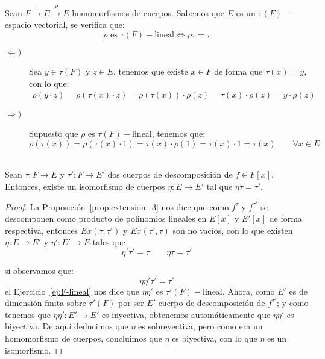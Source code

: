 \begin{ejercicio}\label{ej:F-lineal}
    Sean $F\stackrel{\tau}{\to}E\stackrel{\rho}{\to}E$ homomorfismos de cuerpos. Sabemos que $E$ es un $\tau(F)-$espacio vectorial, se verifica que: 
    \begin{equation*}
        \rho \text{\ es\ } \tau(F)-\text{lineal} \Longleftrightarrow \rho\tau = \tau
    \end{equation*}

    \begin{description}
        \item [$\Longleftarrow )$] Sea $y\in \tau(F)$ y $z\in E$, tenemos que existe $x\in F$ de forma que $\tau(x)=y$, con lo que:
            \begin{align*}
                \rho(y\cdot z) = \rho(\tau(x)\cdot z) = \rho(\tau(x))\cdot \rho(z) = \tau(x)\cdot \rho(z) = y\cdot \rho(z)
            \end{align*}
        \item [$\Longrightarrow )$] Supuesto que $\rho$ es $\tau(F)-$lineal, tenemos que:
            \begin{equation*} 
                \rho(\tau(x)) = \rho(\tau(x)\cdot 1)= \tau(x)\cdot \rho(1) = \tau(x)\cdot 1 = \tau(x) \qquad \forall x\in E
            \end{equation*}
    \end{description}
\end{ejercicio}

\begin{teo} \ \\
    Sean $\tau:F\to E$ y $\tau':F\to E'$ dos cuerpos de descomposición de $f\in F[x]$. Entonces, existe un isomorfismo de cuerpos $\eta:E\to E'$ tal que $\eta \tau = \tau'$.
    \begin{proof}
        La Proposición~\ref{prop:extension_3} nos dice que como $f^\tau$ y $f^{\tau'}$ se descomponen como producto de polinomios lineales en $E[x]$ y $E'[x]$ de forma respectiva, entonces $Ex(\tau,\tau')$ y $Ex(\tau',\tau)$ son no vacíos, con lo que existen $\eta:E\to E'$ y $\eta':E'\to E$ tales que 
        \begin{equation*}
            \eta'\tau' = \tau\qquad \eta\tau = \tau'
        \end{equation*}

        si observamos que:
        \begin{equation*}
            \eta\eta'\tau' = \tau'
        \end{equation*}
        el Ejercicio~\ref{ej:F-lineal} nos dice que $\eta\eta'$ es $\tau'(F)-$lineal. Ahora, como $E'$ es de dimensión finita sobre $\tau'(F)$ por ser $E'$ cuerpo de descomposición de $f^{\tau'}$; y como tenemos que $\eta\eta':E'\to E'$ es inyectiva, obtenemos automáticamente que $\eta\eta'$ es biyectiva. De aquí deducimos que $\eta$ es sobreyectiva, pero como era un homomorfismo de cuerpos, concluimos que $\eta$ es biyectiva, con lo que $\eta$ es un isomorfismo.
    \end{proof}
\end{teo}

